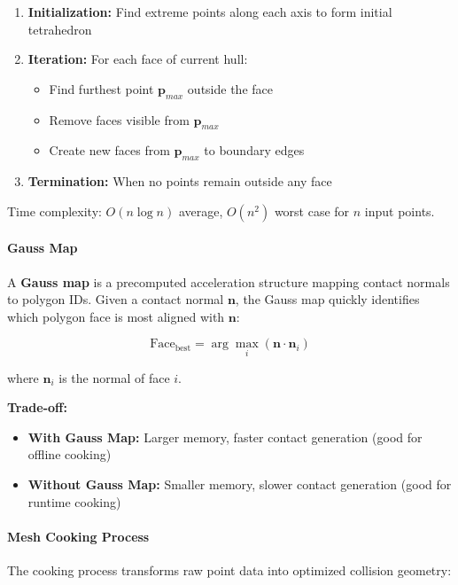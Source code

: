\begin{enumerate}
    \item \textbf{Initialization:} Find extreme points along each axis to form initial tetrahedron
    \item \textbf{Iteration:} For each face of current hull:
    \begin{itemize}
        \item Find furthest point $\mathbf{p}_{max}$ outside the face
        \item Remove faces visible from $\mathbf{p}_{max}$
        \item Create new faces from $\mathbf{p}_{max}$ to boundary edges
    \end{itemize}
    \item \textbf{Termination:} When no points remain outside any face
\end{enumerate}

Time complexity: $O(n \log n)$ average, $O(n^2)$ worst case for $n$ input points.

\paragraph{Gauss Map}

A \textbf{Gauss map} is a precomputed acceleration structure mapping contact normals to polygon IDs. Given a contact normal $\mathbf{n}$, the Gauss map quickly identifies which polygon face is most aligned with $\mathbf{n}$:

\begin{equation}
\text{Face}_{\text{best}} = \arg\max_{i} (\mathbf{n} \cdot \mathbf{n}_i)
\end{equation}

where $\mathbf{n}_i$ is the normal of face $i$.

\textbf{Trade-off:}
\begin{itemize}
    \item \textbf{With Gauss Map:} Larger memory, faster contact generation (good for offline cooking)
    \item \textbf{Without Gauss Map:} Smaller memory, slower contact generation (good for runtime cooking)
\end{itemize}

\paragraph{Mesh Cooking Process}

The cooking process transforms raw point data into optimized collision geometry:

